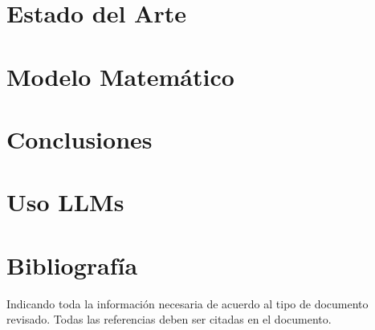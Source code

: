 \documentclass[letter, 10pt]{article}
\begin{document}
\section{Estado del Arte}


\section{Modelo Matem\'atico}


\section{Conclusiones}


\section{Uso LLMs}


\pagebreak
\section{Bibliograf\'ia}
Indicando toda la informaci\'on necesaria de acuerdo al tipo de documento revisado. Todas las referencias deben ser citadas en el documento.


\end{document}
